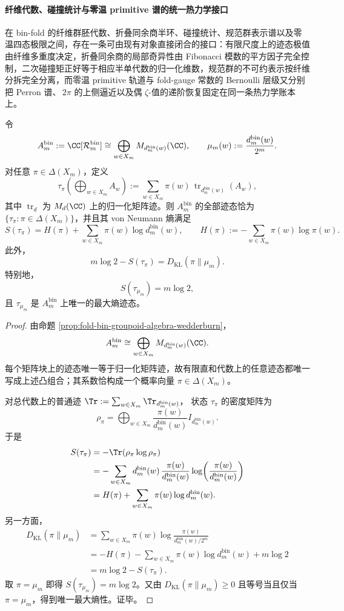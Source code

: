 \paragraph{纤维代数、碰撞统计与零温 primitive 谱的统一热力学接口}
在 bin-fold 的纤维群胚代数、折叠同余商半环、碰撞统计、规范群表示谱以及零温四态极限之间，存在一条可由现有对象直接闭合的接口：有限尺度上的迹态极值由纤维多重度决定，折叠同余商的局部奇异性由 Fibonacci 模数的平方因子完全控制，二次碰撞矩正好等于相应半单代数的归一化维数，规范群的不可约表示按纤维分拆完全分离，而零温 primitive 轨道与 fold-gauge 常数的 Bernoulli 层级又分别把 Perron 谱、\(\,2\pi\) 的上侧逼近以及偶 \(\zeta\)-值的递阶恢复固定在同一条热力学账本上。

\begin{theorem}[纤维群胚代数上的最大熵迹态唯一由均匀微态推前给出]\label{thm:xi-foldbin-groupoid-maxent-tracial-state}
令
\[
A_m^{\mathrm{bin}}:=\CC[\mathcal R_m^{\mathrm{bin}}]
\cong
\bigoplus_{w\in X_m} M_{d_m^{\mathrm{bin}}(w)}(\CC),
\qquad
\mu_m(w):=\frac{d_m^{\mathrm{bin}}(w)}{2^m}.
\]
对任意 \(\pi\in\Delta(X_m)\)，定义
\[
\tau_\pi\!\left(\bigoplus_{w\in X_m}A_w\right)
:=
\sum_{w\in X_m}\pi(w)\,\operatorname{tr}_{d_m^{\mathrm{bin}}(w)}(A_w),
\]
其中 \(\operatorname{tr}_d\) 为 \(M_d(\CC)\) 上的归一化矩阵迹。则 \(A_m^{\mathrm{bin}}\) 的全部迹态恰为 \(\{\tau_\pi:\pi\in\Delta(X_m)\}\)，并且其 von Neumann 熵满足
\[
S(\tau_\pi)
=
H(\pi)+\sum_{w\in X_m}\pi(w)\log d_m^{\mathrm{bin}}(w),
\qquad
H(\pi):=-\sum_{w\in X_m}\pi(w)\log\pi(w).
\]
此外，
\[
m\log 2-S(\tau_\pi)=D_{\mathrm{KL}}(\pi\|\mu_m).
\]
特别地，
\[
S(\tau_{\mu_m})=m\log 2,
\]
且 \(\tau_{\mu_m}\) 是 \(A_m^{\mathrm{bin}}\) 上唯一的最大熵迹态。
\end{theorem}
\begin{proof}
由命题 \ref{prop:fold-bin-groupoid-algebra-wedderburn}，
\[
A_m^{\mathrm{bin}}
\cong
\bigoplus_{w\in X_m} M_{d_m^{\mathrm{bin}}(w)}(\CC).
\]
每个矩阵块上的迹态唯一等于归一化矩阵迹，故有限直和代数上的任意迹态都唯一写成上述凸组合；其系数恰构成一个概率向量 \(\pi\in\Delta(X_m)\)。
\par
对总代数上的普通迹
\(
\Tr:=\sum_{w\in X_m}\Tr_{d_m^{\mathrm{bin}}(w)}
\)，
状态 \(\tau_\pi\) 的密度矩阵为
\[
\rho_\pi
=
\bigoplus_{w\in X_m}
\frac{\pi(w)}{d_m^{\mathrm{bin}}(w)}I_{d_m^{\mathrm{bin}}(w)}.
\]
于是
\[
\begin{aligned}
S(\tau_\pi)
&=-\Tr(\rho_\pi\log\rho_\pi)\\
&=
-\sum_{w\in X_m}d_m^{\mathrm{bin}}(w)\,
\frac{\pi(w)}{d_m^{\mathrm{bin}}(w)}
\log\!\left(\frac{\pi(w)}{d_m^{\mathrm{bin}}(w)}\right)\\
&=
H(\pi)+\sum_{w\in X_m}\pi(w)\log d_m^{\mathrm{bin}}(w).
\end{aligned}
\]
另一方面，
\[
\begin{aligned}
D_{\mathrm{KL}}(\pi\|\mu_m)
&=
\sum_{w\in X_m}\pi(w)
\log\frac{\pi(w)}{d_m^{\mathrm{bin}}(w)/2^m}\\
&=
-H(\pi)-\sum_{w\in X_m}\pi(w)\log d_m^{\mathrm{bin}}(w)+m\log 2\\
&=
m\log 2-S(\tau_\pi).
\end{aligned}
\]
取 \(\pi=\mu_m\) 即得 \(S(\tau_{\mu_m})=m\log 2\)。又由 \(D_{\mathrm{KL}}(\pi\|\mu_m)\ge 0\) 且等号当且仅当 \(\pi=\mu_m\)，得到唯一最大熵性。证毕。
\end{proof}

